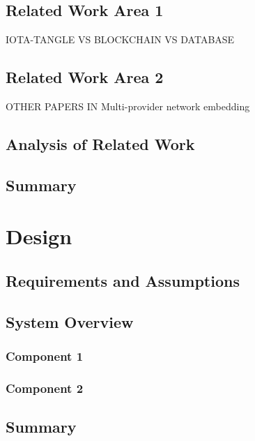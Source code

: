 \section{Related Work Area 1}

IOTA-TANGLE VS BLOCKCHAIN VS DATABASE

\section{Related Work Area 2}

OTHER PAPERS IN Multi-provider network embedding
\section{Analysis of Related Work}

\section{Summary}

\chapter{Design}
\label{ch:design}

\section{Requirements and Assumptions}

\section{System Overview}

\subsection{Component 1}

\subsection{Component 2}

\section{Summary}

